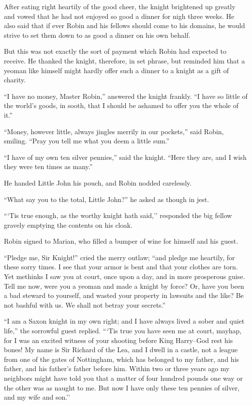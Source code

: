 After eating right heartily of the good cheer, the knight brightened up
greatly and vowed that he had not enjoyed so good a dinner for nigh
three weeks. He also said that if ever Robin and his fellows should come
to his domains, he would strive to set them down to as good a dinner on
his own behalf.

But this was not exactly the sort of payment which Robin had expected to
receive. He thanked the knight, therefore, in set phrase, but reminded
him that a yeoman like himself might hardly offer such a dinner to a
knight as a gift of charity.

``I have no money, Master Robin,'' answered the knight frankly. ``I have
so little of the world's goods, in sooth, that I should be ashamed to
offer you the whole of it.''

``Money, however little, always jingles merrily in our pockets,'' said
Robin, smiling. ``Pray you tell me what you deem a little sum.''

``I have of my own ten silver pennies,'' said the knight. ``Here they
are, and I wish they were ten times as many.''

He handed Little John his pouch, and Robin nodded carelessly.

``What say you to the total, Little John?'' he asked as though in jest.

```Tis true enough, as the worthy knight hath said,'' responded the big
fellow gravely emptying the contents on his cloak.

Robin signed to Marian, who filled a bumper of wine for himself and his
guest.

``Pledge me, Sir Knight!'' cried the merry outlaw; ``and pledge me
heartily, for these sorry times. I see that your armor is bent and that
your clothes are torn. Yet methinks I saw you at court, once upon a day,
and in more prosperous guise. Tell me now, were you a yeoman and made a
knight by force? Or, have you been a bad steward to yourself, and wasted
your property in lawsuits and the like? Be not bashful with us. We shall
not betray your secrets.''

``I am a Saxon knight in my own right; and I have always lived a sober
and quiet life,'' the sorrowful guest replied. ```Tis true you have seen
me at court, mayhap, for I was an excited witness of your shooting
before King Harry--God rest his bones! My name is Sir Richard of the
Lea, and I dwell in a castle, not a league from one of the gates of
Nottingham, which has belonged to my father, and his father, and his
father's father before him. Within two or three years ago my neighbors
might have told you that a matter of four hundred pounds one way or the
other was as naught to me. But now I have only these ten pennies of
silver, and my wife and son.''

